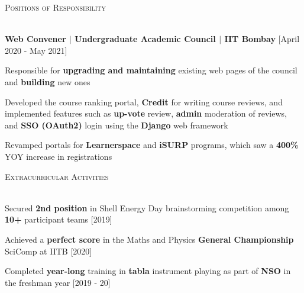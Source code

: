 \documentclass[11pt]{article}
\renewcommand{\section}[1]{
    \textsc{\Large{#1}}
    \vspace*{-10pt} \\ \hspace*{-5pt} 
    \hrulefill \\
    \vspace*{-15pt}
}
\newcommand{\smallbullet}{
    \tiny$\bullet$
}
\newenvironment{bullet-list-major}{
    \vspace*{-5pt}
    \begin{list}{
        \smallbullet
    }{
        \setlength\leftmargin{15pt}\topsep 0pt \itemsep -6pt
    }
} {
    \end{list}
}
\newcommand{\bigblocknobylines}[2]{
    {
        \vspace*{-5pt}
        \hspace*{-8pt} \textbf{#1} \hfill #2 \newline
        \vspace*{-20pt}
    }
}
\newenvironment{bullet-list-minor}{
    \begin{list}{
        \smallbullet
    }{
        \setlength\leftmargin{15pt}\topsep 0pt \itemsep -6pt
    }
} {
    \end{list}
}
\begin{document}
    \section{Positions of Responsibility}

    \bigblocknobylines{
        Web Convener \(|\) Undergraduate Academic Council \(|\) IIT Bombay
    }{
        [April 2020 - May 2021]
    }
    \begin{bullet-list-minor}
        \item Responsible for \textbf{upgrading and maintaining} existing web pages of the council and \textbf{building} new ones
        \item Developed the course ranking portal, \textbf{Credit} for writing course reviews, and implemented features such as
        \textbf{up-vote} review, \textbf{admin} moderation of reviews, and \textbf{SSO (OAuth2)} login using the \textbf{Django} web framework
        \item Revamped portals for \textbf{Learnerspace} and \textbf{iSURP} programs, which saw a \textbf{400\%} YOY increase in registrations
    \end{bullet-list-minor}
    

    \section{Extracurricular Activities}

    \begin{bullet-list-major}
        \item Secured \textbf{2nd position} in Shell Energy Day brainstorming competition among \textbf{10+} participant teams  \hfill [2019]
        \item Achieved a \textbf{perfect score} in the Maths and Physics \textbf{General Championship} SciComp at IITB    \hfill [2020]
        \item Completed \textbf{year-long} training in \textbf{tabla} instrument playing as part of \textbf{NSO} in the freshman year \hfill [2019 - 20]
    \end{bullet-list-major}


    \vspace*{-200pt}
\end{document}
